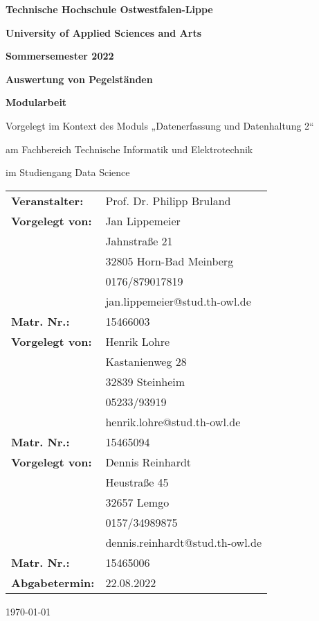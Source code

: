 \documentclass[../document.tex]{subfiles}
\begin{document}
\begin{titlepage}
    \begin{center}   
    {\textbf{Technische Hochschule Ostwestfalen-Lippe}}\\
    {\textbf{University of Applied Sciences and Arts}\par}\vspace{1.5cm}
    {\Large\bfseries Sommersemester 2022\par}\vspace{1.5cm}
    {\huge\bfseries Auswertung von Pegelständen\par}
    \vspace{1.5cm}
    {\Large\bfseries Modularbeit}\\
    {\large Vorgelegt im Kontext des Moduls „Datenerfassung und Datenhaltung 2“\par} \vspace{1cm}
    {\large am Fachbereich Technische Informatik und Elektrotechnik}\\
    {\large im Studiengang Data Science\par} \vspace{2cm}
    \end{center}
    \vfill
    \begin{tabular}{l l}
    \textbf{Veranstalter:}& {Prof. Dr. Philipp Bruland}\\ 
    \textbf{Vorgelegt von:}& {Jan Lippemeier}\\ 
    \textbf{} & {Jahnstraße 21} \\
    \textbf{} & {32805 Horn-Bad Meinberg} \\
    \textbf{} & {0176/879017819} \\
    \textbf{} & {jan.lippemeier@stud.th-owl.de} \\
    \textbf{Matr. Nr.:} & {15466003} \\
    \textbf{Vorgelegt von:}& {Henrik Lohre}\\ 
    \textbf{} & {Kastanienweg 28} \\
    \textbf{} & {32839 Steinheim} \\
    \textbf{} & {05233/93919} \\
    \textbf{} & {henrik.lohre@stud.th-owl.de} \\
    \textbf{Matr. Nr.:} & {15465094} \\
    \textbf{Vorgelegt von:}& {Dennis Reinhardt}\\ 
    \textbf{} & {Heustraße 45} \\
    \textbf{} & {32657 Lemgo} \\
    \textbf{} & {0157/34989875} \\
    \textbf{} & {dennis.reinhardt@stud.th-owl.de} \\
    \textbf{Matr. Nr.:} & {15465006} \\
    \textbf{Abgabetermin:} & {22.08.2022} 
    \end{tabular}   
    \begin{center}
    \vfill

    {\large\today\par}
    \end{center}
\end{titlepage}
\end{document}

